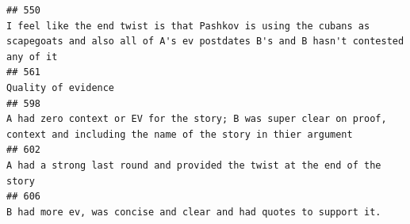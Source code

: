 \documentclass[
]{article}
\begin{document}
\begin{verbatim}
## 550                                                                                                                                                                                                                                                                                                                                                                                                                                                  I feel like the end twist is that Pashkov is using the cubans as scapegoats and also all of A's ev postdates B's and B hasn't contested any of it
## 561                                                                                                                                                                                                                                                                                                                                                                                                                                                                                                                                                                                Quality of evidence
## 598                                                                                                                                                                                                                                                                                                                                                                                                                                                                  A had zero context or EV for the story; B was super clear on proof, context and including the name of the story in thier argument
## 602                                                                                                                                                                                                                                                                                                                                                                                                                                                                                                                           A had a strong last round and provided the twist at the end of the story
## 606                                                                                                                                                                                                                                                                                                                                                                                                                                                                                                                                 B had more ev, was concise and clear and had quotes to support it.

\end{verbatim}
\end{document}
